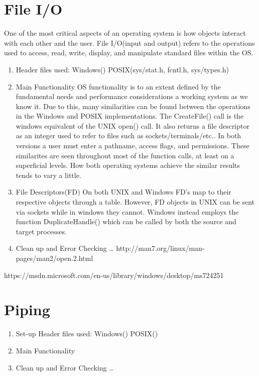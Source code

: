 \documentclass[letterpaper,10pt,titlepage]{article}
\begin{document}
\section{File I/O}
	One of the most critical aspects of an operating system is how objects interact with 
each other and the user. File I/O(input and output) refers to the operations used to access,
read, write, display, and manipulate standard files within the OS. 
	
\begin{enumerate}
  \item Header files used: Windows()			POSIX(sys/stat.h, fcntl.h, sys/types.h)
  
  \item Main Functionality
	OS functionality is to an extent defined by the fundamental needs and performance considerations 
a working system as we know it. Due to this, many similarities can be found between the operations
in the Windows and POSIX implementations. The CreateFile() call is the windows equivalent of the UNIX open()
call. It also returns a file descriptor as an integer used to refer to files such as sockets/terminals/etc..
In both versions a user must enter a pathname, access flags, and permissions. These similarites are seen throughout
most of the function calls, at least on a superficial levels. How both operating systems achieve the similar results 
tends to vary a little. 	

  \item File Descriptors(FD)
On both UNIX and Windows FD's map to their respective objects through a table.  
However, FD objects in UNIX can be sent via sockets while in windows they cannot. Windows instead
employs the function DuplicateHandle() which can be called by both the source and target processes.


  \item Clean up and Error Checking \ldots
http://man7.org/linux/man-pages/man2/open.2.html
\end{enumerate}

https://msdn.microsoft.com/en-us/library/windows/desktop/ms724251%

\section{Piping}
\begin{enumerate}
  \item Set-up
Header files used: Windows()			POSIX()




  \item Main Functionality



  \item Clean up and Error Checking \ldots

\end{enumerate}
\end{document}
